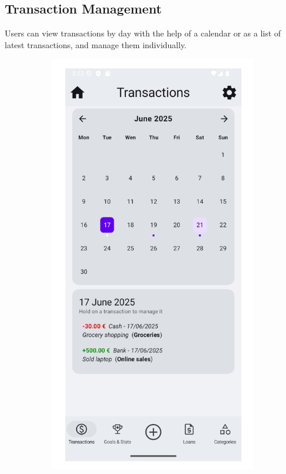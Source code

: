 \documentclass[a4paper,12pt]{article}
\begin{document}
\subsection{Transaction Management}
Users can view transactions by day with the help of a calendar or as a list of latest transactions, and manage them individually.

\begin{figure}[H]
    \centering
    \begin{subfigure}[b]{0.23\textwidth}
        \includegraphics[width=\textwidth]{transactions_day.png}

\end{subfigure}
\end{figure}
\end{document}

